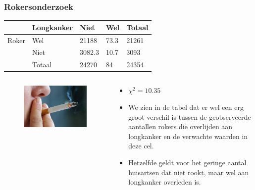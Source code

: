 \documentclass[aspectratio=169]{beamer}
\begin{document}
\begin{frame}
  \frametitle{Rokersonderzoek}
\begin{table}[h]
\begin{tabular}{@{}lllll@{}}
\toprule
      & \textbf{Longkanker} & \textbf{Niet} & \textbf{Wel} & \textbf{Totaal} \\ \midrule
Roker & Wel                 & 21188         & 73.3         & 21261           \\
      & Niet                & 3082.3        & 10.7         & 3093            \\
      & Totaal              & 24270         & 84           & 24354           \\ \bottomrule
\end{tabular}
\end{table}

\begin{columns}
  \begin{column}{0.3 \textwidth}

  \begin{figure}
    \centering
      \includegraphics[width=1.00\textwidth]{img/les-6-smoking.jpg}
  \end{figure}

  \end{column}
  \begin{column}{0.7 \textwidth}

  \begin{itemize}
    \item $\chi^{2} = 10.35$
    \item We zien in de tabel  dat er wel een erg groot verschil is tussen de geobserveerde aantallen rokers die overlijden aan longkanker en de verwachte waarden in deze cel.
    \item Hetzelfde geldt voor het geringe aantal huisartsen dat niet rookt, maar wel aan longkanker overleden is.
  \end{itemize}
  \end{column}
\end{columns}
\end{frame}
\end{document}
